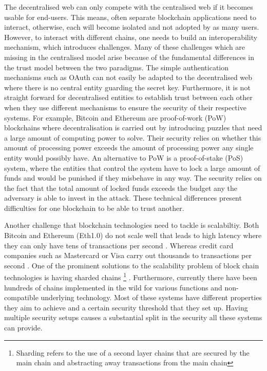 The decentralised web can only compete with the centralised web if it becomes usable for end-users. This means, often separate blockchain applications need to interact, otherwise, each will become isolated and not adopted by as many users. However, to interact with different chains, one needs to build an interoperability mechanism, which introduces challenges. Many of these challenges which are missing in the centralised model arise because of the fundamental differences in the trust model between the two paradigms. The simple authentication mechanisms such as OAuth \cite{hardt2012oauth} can not easily be adapted to the decentralised web where there is no central entity guarding the secret key. Furthermore, it is not straight forward for decentralised entities to establish trust between each other when they use different mechanisms to ensure the security of their respective systems. For example, Bitcoin\cite{} and Ethereum\cite{} are proof-of-work (PoW) blockchains where decentralisation is carried out by introducing puzzles that need a large amount of computing power to solve. Their security relies on whether this amount of processing power exceeds the amount of processing power any single entity would possibly have. An alternative to PoW is a proof-of-stake (PoS) system, where the entities that control the system have to lock a large amount of funds and would be punished if they misbehave in any way. The security relies on the fact that the total amount of locked funds exceeds the budget any the adversary is able to invest in the attack. These technical differences present difficulties for one blockchain to be able to trust another.

Another challenge that blockchain technologies need to tackle is scalabiltiy. Both Bitcoin and Ethereum (Eth1.0) do not scale well that leads to high latency where they can only have tens of transactions per second \cite{scaling} \cite{}. Whereas credit card companies such as Mastercard or Visa carry out thousands to transactions per second \cite{}. One of the prominent solutions to the scalability problem of block chain technologies is having sharded chains \footnote{Sharding refers to the use of a second layer chains that are secured by the main chain and abstracting away transactions from the main chain} \cite{sharding} . %
Furthermore, currently there have been hundreds of chains implemented in the wild for various functions and non-compatible underlying technology. Most of these systems have different properties they aim to achieve and a certain security threshold that they set up. Having multiple security setups causes a substantial split in the security all these systems can provide. 

